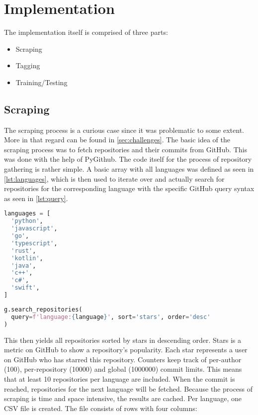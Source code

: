 \section{Implementation}
\label{sec:implementation}

The implementation itself is comprised of three parts:

\begin{itemize}
  \item Scraping
  \item Tagging
  \item Training/Testing
\end{itemize}

\subsection{Scraping}

The scraping process is a curious case since it was problematic to some extent.
More in that regard can be found in \autoref{sec:challenges}. The basic idea
of the scraping process was to fetch repositories and their commits from
GitHub. This was done with the help of PyGithub. The code itself for the
process of repository gathering is rather simple. A basic array with all
languages was defined as seen in \autoref{lst:languages}, which is then used to
iterate over and actually search for repositories for the corresponding language
with the specific GitHub query syntax as seen in \autoref{lst:query}.

\begin{lstlisting}[language=python, label={lst:languages}, caption={Array of all languages for scraping}]
languages = [
  'python',
  'javascript',
  'go',
  'typescript',
  'rust',
  'kotlin',
  'java',
  'c++',
  'c#',
  'swift',
]
\end{lstlisting}

\begin{lstlisting}[language=python, label={lst:query}, caption={GitHub query syntax}]
g.search_repositories(
  query=f'language:{language}', sort='stars', order='desc'
)
\end{lstlisting}

This then yields all repositories sorted by stars in descending order.
Stars is a metric on GitHub to show a repository's popularity. Each star
represents a user on GitHub who has starred this repository. Counters keep track of
per-author (100), per-repository (10000) and global (1000000) commit limits.
This means that at least 10 repositories per language are included. When the
 commit is reached, repositories for the next language will
be fetched. Because the process of scraping is time and space intensive, the
results are cached. Per language, one CSV file is created. The file consists of
rows with four columns:

